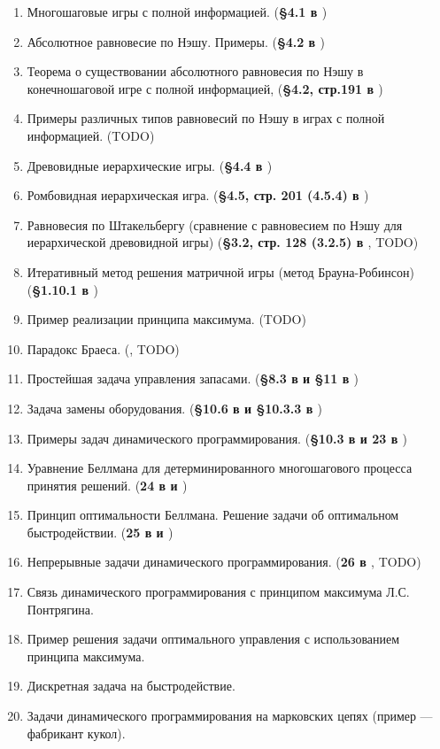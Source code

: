 \documentclass[a4paper,14pt]{extarticle}
\begin{document}
\begin{enumerate}
    \item Многошаговые игры с полной информацией.
        (\textbf{\S 4.1 в \cite{gametheory-2012}})
    \item Абсолютное равновесие по Нэшу. Примеры.
        (\textbf{\S 4.2 в \cite{gametheory-2012}})
    \item Теорема о существовании абсолютного равновесия по Нэшу в конечношаговой игре с полной информацией,
        (\textbf{\S 4.2, стр.191 в \cite{gametheory-2012}})
    \item Примеры различных типов равновесий по Нэшу в играх с полной информацией.
        (TODO)
    \item Древовидные иерархические игры.
        (\textbf{\S 4.4 в \cite{gametheory-2012}})
    \item Ромбовидная иерархическая игра.
        (\textbf{\S 4.5, стр. 201 (4.5.4) в \cite{gametheory-2012}})
    \item Равновесия по Штакельбергу (сравнение с равновесием по Нэшу для иерархической древовидной игры)
        (\textbf{\S 3.2, стр. 128 (3.2.5) в \cite{gametheory-2012}}, TODO)
    \item Итеративный метод решения матричной игры (метод Брауна-Робинсон)
        (\textbf{\S 1.10.1 в \cite{gametheory-2012}})
    \item Пример реализации принципа максимума.
        (TODO)
    \item Парадокс Браеса.
        (\textbf{\cite{wiki-braess-ru}}, TODO)
    \item Простейшая задача управления запасами.
        (\textbf{\S 8.3 в \cite{vagner-2-1983} и \S 11 в \cite{taha-2002}})
    \item Задача замены оборудования.
        (\textbf{\S 10.6 в \cite{vagner-2-1983} и \S 10.3.3 в \cite{taha-2002}})
    \item Примеры задач динамического программирования.
        (\textbf{\S 10.3 в \cite{taha-2002} и 23 в \cite{sharshukov-xyz}})
    \item Уравнение Беллмана для детерминированного многошагового процесса принятия решений.
        (\textbf{24 в \cite{sharshukov-xyz} и \cite{kuznetsov-dp}})
    \item Принцип оптимальности Беллмана. Решение задачи об оптимальном быстродействии.
        (\textbf{25 в \cite{sharshukov-xyz} и \cite{kuznetsov-dp}})
    \item Непрерывные задачи динамического программирования.
        (\textbf{26 в \cite{sharshukov-xyz}}, TODO)
    \item Связь динамического программирования с принципом максимума Л.С. Понтрягина.
    \item Пример решения задачи оптимального управления с использованием принципа максимума.
    \item Дискретная задача на быстродействие.
    \item Задачи динамического программирования на марковских цепях (пример --- фабрикант кукол).
\end{enumerate}

\custombibliography
\end{document}

